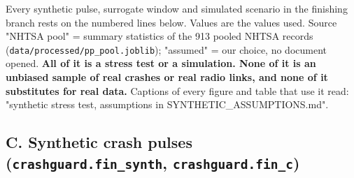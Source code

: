 


Every synthetic pulse, surrogate window and simulated scenario in the finishing branch rests on the numbered lines below. Values are the values used. Source "NHTSA pool" = summary statistics of the 913 pooled NHTSA records (\texttt{data/processed/pp\_pool.joblib}); "assumed" = our choice, no document opened. \textbf{All of it is a stress test or a simulation. None of it is an unbiased sample of real crashes or real radio links, and none of it substitutes for real data.} Captions of every figure and table that use it read: "synthetic stress test, assumptions in SYNTHETIC\_ASSUMPTIONS.md".

\subsection*{C. Synthetic crash pulses (\texttt{crashguard.fin\_synth}, \texttt{crashguard.fin\_c})}

